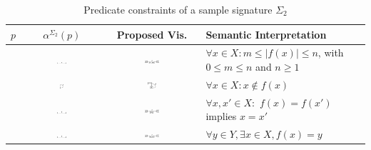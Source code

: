 \documentclass{eceasst}
\begin{document}
\begin{table}[h]\label{tbl:predicateconstraint}
 \caption{Predicate constraints of a sample signature $\Sigma_2$}
 \small
 \begin{center}
    \begin{tabular}{| l | c | c | p{6cm} | }    
    \hline
    $p$ & $\alpha^{\Sigma_2}(p)$ & Proposed Vis. & Semantic Interpretation \\ \hline
    [mult(n,m)] & \includegraphics[width=0.13\textwidth]{mult.pdf} & \includegraphics[width=0.16\textwidth]{mult_vis.pdf} & $\forall x \in X : m \leq |f(x)| \leq n$, 
																		  with $0 \leq m \leq n$ and $n \geq 1$ \\ \hline
    [irreflexive] & \includegraphics[width=0.05\textwidth]{irr_arity.pdf} & \includegraphics[width=0.09\textwidth]{irr_vis.pdf} & $\forall x \in X : x \notin f(x)$ \\ \hline
    [injective] & \includegraphics[width=0.13\textwidth]{mult.pdf} & \includegraphics[width=0.16\textwidth]{inj_vis.pdf} & $\forall x,x' \in X :$ $f(x) = f(x')$ implies $x = x'$ \\ \hline
    [surjective] & \includegraphics[width=0.13\textwidth]{mult.pdf} & \includegraphics[width=0.16\textwidth]{surj_vis.pdf} & $\forall y \in Y, \exists x \in X, f(x) = y $ \\ \hline

\end{tabular}
\end{center}
\end{table}
\end{document}
